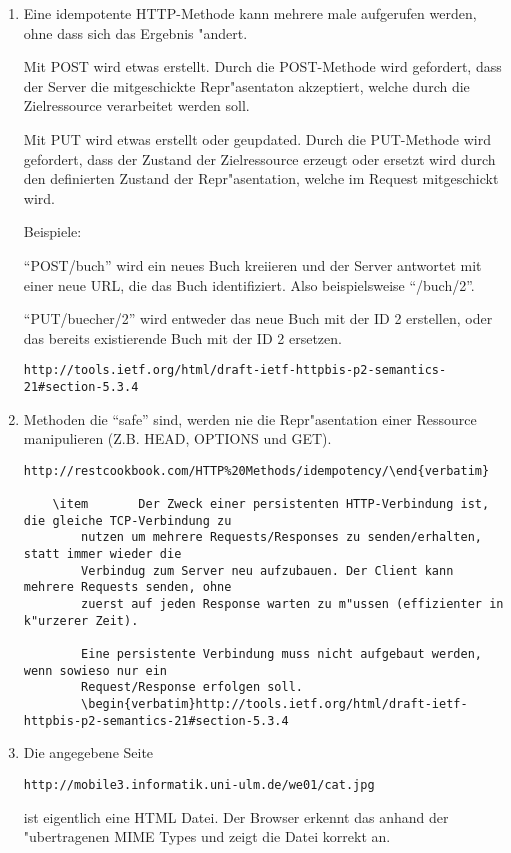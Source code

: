 \documentclass[11pt, oneside, BCOR0mm, DIV9, headinclude]{scrartcl}
\begin{document}
\begin{enumerate}
    \item 	Eine idempotente HTTP-Methode kann mehrere male aufgerufen werden, ohne dass sich
		das Ergebnis "andert.

		Mit POST wird etwas erstellt.
		Durch die POST-Methode wird gefordert, dass der Server die mitgeschickte Repr"asentaton 
		akzeptiert, welche durch die Zielressource verarbeitet werden soll.

		Mit PUT wird etwas erstellt oder geupdated.
		Durch die PUT-Methode wird gefordert, dass der Zustand der Zielressource erzeugt oder 
		ersetzt wird durch den definierten Zustand der Repr"asentation, welche im Request 
		mitgeschickt wird.


		Beispiele:

		``POST/buch'' wird ein neues Buch kreiieren und
		der Server antwortet mit einer neue URL, die das Buch identifiziert.
		Also beispielsweise ``/buch/2''.

		``PUT/buecher/2'' wird entweder das neue Buch mit der ID 2 erstellen, oder das 
		bereits existierende Buch mit der ID 2 ersetzen.
		\begin{verbatim}http://tools.ietf.org/html/draft-ietf-httpbis-p2-semantics-21#section-5.3.4 \end{verbatim}


    \item       Methoden die ``safe'' sind, werden nie die Repr"asentation einer Ressource
	        manipulieren (Z.B. HEAD, OPTIONS und GET).
		\begin{verbatim}http://restcookbook.com/HTTP%20Methods/idempotency/\end{verbatim}

    \item       Der Zweck einer persistenten HTTP-Verbindung ist, die gleiche TCP-Verbindung zu
		nutzen um mehrere Requests/Responses zu senden/erhalten, statt immer wieder die 
		Verbindug zum Server neu aufzubauen. Der Client kann mehrere Requests senden, ohne 
		zuerst auf jeden Response warten zu m"ussen (effizienter in k"urzerer Zeit).
		
		Eine persistente Verbindung muss nicht aufgebaut werden, wenn sowieso nur ein
		Request/Response erfolgen soll.
		\begin{verbatim}http://tools.ietf.org/html/draft-ietf-httpbis-p2-semantics-21#section-5.3.4 \end{verbatim}

	\item   Die angegebene Seite \begin{verbatim}http://mobile3.informatik.uni-ulm.de/we01/cat.jpg\end{verbatim}
		ist eigentlich eine HTML Datei. Der Browser erkennt das anhand der "ubertragenen MIME Types und zeigt
		die Datei korrekt an.


\end{enumerate}
\end{document}
